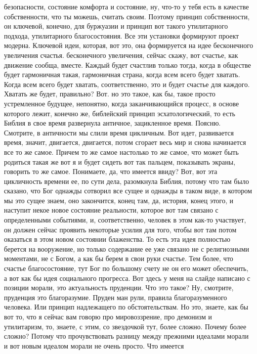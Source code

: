 безопасности, состояние комфорта и состояние, ну, что-то у тебя есть в качестве
собственности, что ты можешь, считать своим. Поэтому принцип собственности, он
ключевой, конечно, для буржуазии и принцип вот такого утилитарного подхода,
утилитарного благосостояния. Все эти установки формируют проект модерна.
Ключевой идеи, которая, вот это, она формируется на идее бесконечного увеличения
счастья. бесконечного увеличения, сейчас скажу, вот счастье, как движение
сообща, вместе. Каждый будет счастлив только тогда, когда в обществе будет
гармоничная такая, гармоничная страна, когда всем всего будет хватать. Когда
всем всего будет хватать, соответственно, это и будет счастье для каждого.
Хватать же будет, правильно? Вот. но это такое, как бы, такое просто
устремленное будущее, непонятно, когда заканчивающийся процесс, в основе
которого лежит, конечно же, библейский принцип эсхатологический, то есть Библия
в свое время развернула античное, зацикленное время. Поясню. Смотрите, в
античности мы слили время цикличным. Вот идет, развивается время, значит,
двигается, двигается, потом сгорает весь мир и снова начинается все то же самое.
Причем то же самое настолько то же самое, что может быть родиться такая же вот я
и будет сидеть вот так пальцем, показывать экраны, говорить то же самое.
Понимаете, да, что имеется ввиду? Вот, вот эта цикличность времени ее, по сути
дела, разомкнула Библия, потому что там было сказано, что Бог однажды сотворил
все сущее и однажды в таком виде, в котором мы это сущее знаем, оно закончится,
конец там, да, история, конец этого, и наступит некое новое состояние
реальности, которое вот там связано с определенными событиями, и,
соответственно, человек в этом как-то участвует, он должен сейчас проявить
некоторые усилия для того, чтобы вот там потом оказаться в этом новом состоянии
блаженства. То есть эта идея полностью берется на вооружение, но только
содержание ее уже связано не с религиозными моментами, не с Богом, а как бы
берем в свои руки счастье. Тем более, что счастье благосостояние, тут Бог по
большому счету не он его может обеспечить, а вот как бы идея социального
прогресса. Вот здесь у меня на слайде написано с позиции морали, это
актуальность пруденции. Что это такое? Ну, смотрите, пруденция это благоразумие.
Пруден ман рули, правила благоразуменного человека. Или принцип надлежащего по
обстоятельствам. Но это, знаете, как бы вот то, что я сейчас вам говорю про
мировоззрение, про демонизм и утилитаризм, то, знаете, с этим, со звездочкой
тут, более сложно. Почему более сложно? Потому что прочувствовать разницу между
прежними идеалами морали и вот новым идеалом морали не очень просто. Что имеется
